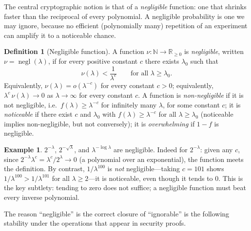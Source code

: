 \documentclass[11pt,a4paper]{article}
\theoremstyle{definition}
\newtheorem{definition}[theorem]{Definition}
\newtheorem{example}[theorem]{Example}
\theoremstyle{remark}
\newcommand{\N}{\ensuremath{\mathbb{N}}}
\newcommand{\R}{\ensuremath{\mathbb{R}}}
\DeclareMathOperator{\negl}{negl}
\begin{document}
The central cryptographic notion is that of a \emph{negligible} function: one that shrinks faster than the reciprocal of every polynomial. A negligible probability is one we may ignore, because no efficient (polynomially many) repetition of an experiment can amplify it to a noticeable chance.

\begin{definition}[Negligible function]\label{probability:def-negl}
A function \(\nu\colon \N \to \R_{\ge 0}\) is \emph{negligible}, written \(\nu = \negl(\lambda)\), if for every positive constant \(c\) there exists \(\lambda_0\) such that
\[
\nu(\lambda) < \frac{1}{\lambda^{c}} \qquad \text{for all } \lambda \ge \lambda_0.
\]
Equivalently, \(\nu(\lambda) = o(\lambda^{-c})\) for every constant \(c > 0\); equivalently, \(\lambda^{c}\,\nu(\lambda) \to 0\) as \(\lambda \to \infty\) for every constant \(c\). A function is \emph{non-negligible} if it is not negligible, i.e.\ \(f(\lambda) \ge \lambda^{-c}\) for infinitely many \(\lambda\), for some constant \(c\); it is \emph{noticeable} if there exist \(c\) and \(\lambda_0\) with \(f(\lambda) \ge \lambda^{-c}\) for all \(\lambda \ge \lambda_0\) (noticeable implies non-negligible, but not conversely); it is \emph{overwhelming} if \(1 - f\) is negligible.
\end{definition}

\begin{example}\label{probability:exp-negl}
\(2^{-\lambda}\), \(2^{-\sqrt{\lambda}}\), and \(\lambda^{-\log\lambda}\) are negligible. Indeed for \(2^{-\lambda}\): given any \(c\), since \(2^{-\lambda}\lambda^{c} = \lambda^c / 2^{\lambda} \to 0\) (a polynomial over an exponential), the function meets the definition. By contrast, \(1/\lambda^{100}\) is \emph{not} negligible---taking \(c = 101\) shows \(1/\lambda^{100} > 1/\lambda^{101}\) for all \(\lambda \ge 2\)---it is noticeable, even though it tends to \(0\). This is the key subtlety: tending to zero does not suffice; a negligible function must beat every inverse polynomial.
\end{example}

The reason ``negligible'' is the correct closure of ``ignorable'' is the following stability under the operations that appear in security proofs.
\end{document}
